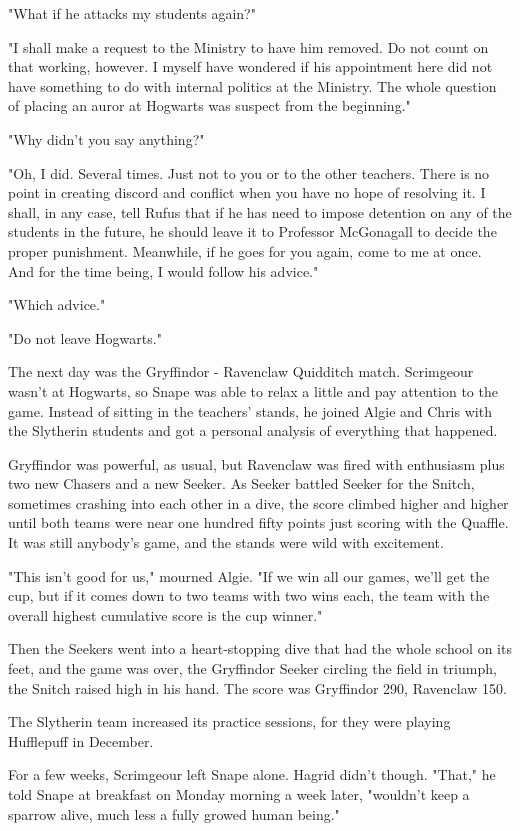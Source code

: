 "What if he attacks my students again?"

"I shall make a request to the Ministry to have him removed. Do not count on that working, however. I myself have wondered if his appointment here did not have something to do with internal politics at the Ministry. The whole question of placing an auror at Hogwarts was suspect from the beginning."

"Why didn't you say anything?"

"Oh, I did. Several times. Just not to you or to the other teachers. There is no point in creating discord and conflict when you have no hope of resolving it. I shall, in any case, tell Rufus that if he has need to impose detention on any of the students in the future, he should leave it to Professor McGonagall to decide the proper punishment. Meanwhile, if he goes for you again, come to me at once. And for the time being, I would follow his advice."

"Which advice."

"Do not leave Hogwarts."

The next day was the Gryffindor - Ravenclaw Quidditch match. Scrimgeour wasn't at Hogwarts, so Snape was able to relax a little and pay attention to the game. Instead of sitting in the teachers' stands, he joined Algie and Chris with the Slytherin students and got a personal analysis of everything that happened.

Gryffindor was powerful, as usual, but Ravenclaw was fired with enthusiasm plus two new Chasers and a new Seeker. As Seeker battled Seeker for the Snitch, sometimes crashing into each other in a dive, the score climbed higher and higher until both teams were near one hundred fifty points just scoring with the Quaffle. It was still anybody's game, and the stands were wild with excitement.

"This isn't good for us," mourned Algie. "If we win all our games, we'll get the cup, but if it comes down to two teams with two wins each, the team with the overall highest cumulative score is the cup winner."

Then the Seekers went into a heart-stopping dive that had the whole school on its feet, and the game was over, the Gryffindor Seeker circling the field in triumph, the Snitch raised high in his hand. The score was Gryffindor 290, Ravenclaw 150.

The Slytherin team increased its practice sessions, for they were playing Hufflepuff in December.

For a few weeks, Scrimgeour left Snape alone. Hagrid didn't though. "That," he told Snape at breakfast on Monday morning a week later, "wouldn't keep a sparrow alive, much less a fully growed human being."


